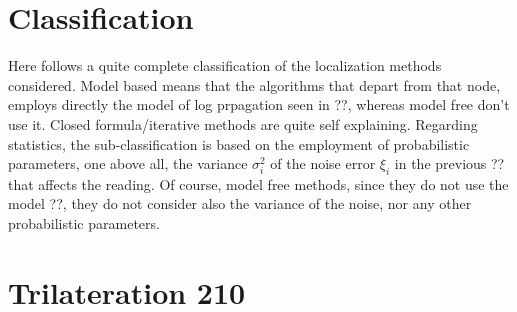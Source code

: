 \documentclass[12pt,twoside]{report}
\begin{document}
\section{Classification}
Here follows a quite complete classification of the localization methods considered. Model based means that the algorithms that depart from that node, employs directly the model of log prpagation seen in ??, whereas model free don't use it. Closed formula/iterative methods are quite self explaining. Regarding statistics, the sub-classification is based on the employment of probabilistic parameters, one above all, the variance $\sigma^2_i$ of the noise error $\xi_i$ in the previous ?? that affects the reading. Of course, model free methods, since they do not use the model ??, they do not consider also the variance of the noise, nor any other probabilistic parameters.

\clearpage
\section{Trilateration 210}
\end{document}
